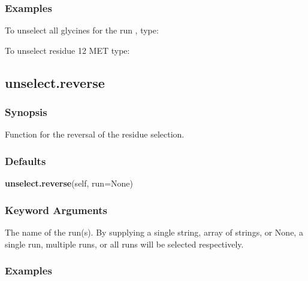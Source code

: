 \subsubsection{Examples}

To unselect all glycines for the run 
, type:




To unselect residue 12 MET type:








\newpage

\subsection{unselect.reverse}


\subsubsection{Synopsis}

Function for the reversal of the residue selection.

\subsubsection{Defaults}

\textsf{\textbf{unselect.reverse}(self, run=None)}


\subsubsection{Keyword Arguments}


  The name of the run(s).  By supplying a single string, array of strings, or None, a single run, multiple runs, or all runs will be selected respectively.

\subsubsection{Examples}

